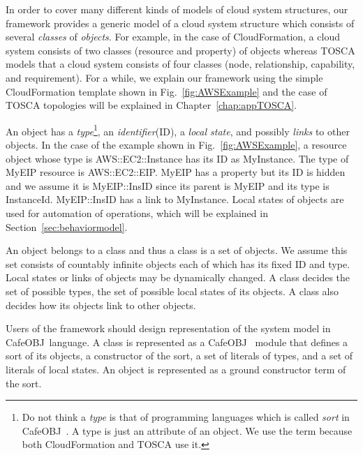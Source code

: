 \documentclass[12pt]{report}
\newcommand{\cafeobj}{{\sf CafeOBJ}~}
\begin{document}
In order to cover many different kinds of models of cloud system
structures, our framework provides a generic model of a cloud system
structure which consists of several {\it classes} of {\it
  objects}. For example, in the case of CloudFormation, a cloud system
consists of two classes (resource and property) of objects whereas
TOSCA models that a cloud system consists of four classes (node,
relationship, capability, and requirement). For a while, we explain
our framework using the simple CloudFormation template shown in
Fig.~\ref{fig:AWSExample} and the case of TOSCA topologies will be
explained in Chapter~\ref{chap:appTOSCA}.

An object has a {\it type}\footnote{Do not think a {\it type} is that
  of programming languages which is called {\it sort} in \cafeobj. A
  type is just an attribute of an object. We use the term because both
  CloudFormation and TOSCA use it.}, an {\it identifier}(ID), a {\it
  local state}, and possibly {\it links} to other objects. In the case
of the example shown in Fig.~\ref{fig:AWSExample}, a resource object
whose type is AWS::EC2::Instance has its ID as MyInstance. The type of
MyEIP resource is AWS::EC2::EIP. MyEIP has a property but its ID is
hidden and we assume it is MyEIP::InsID since its parent is MyEIP and
its type is InstanceId. MyEIP::InsID has a link to MyInstance. Local
states of objects are used for automation of operations, which will be
explained in Section~\ref{sec:behaviormodel}. 

An object belongs to a class and thus a class is a set of objects. We
assume this set consists of countably infinite objects each of which
has its fixed ID and type. Local states or links of objects may be
dynamically changed.  A class decides the set of possible types, the set
of possible local states of its objects. A class also decides how its
objects link to other objects.

Users of the framework should design representation of the system
model in \cafeobj language.  A class is represented as a \cafeobj
module that defines a sort of its objects, a constructor of the sort,
a set of literals of types, and a set of literals of local states.  An
object is represented as a ground constructor term of the sort.
\end{document}

